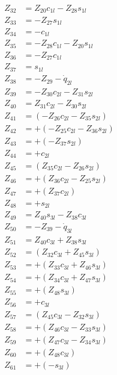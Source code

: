 \begin{multicols}{2}
\begin{align}
Z_{32} &= Z_{20}c_{1l} - Z_{28}s_{1l} \nonumber \\
Z_{33} &= -Z_{27}s_{1l} \nonumber \\ 
Z_{34} &= -c_{1l} \nonumber \\ 
Z_{35} &= -Z_{28}c_{1l} - Z_{20}s_{1l} \nonumber \\ 
Z_{36} &= -Z_{27}c_{1l} \nonumber \\ 
Z_{37} &= s_{1l} \nonumber \\
Z_{38} &=                   - Z_{29} - \dot{q}_{2l} \nonumber \\
Z_{39} &= - Z_{30}c_{2l} - Z_{31}s_{2l} \nonumber \\
Z_{40} &=   Z_{31}c_{2l} - Z_{30}s_{2l} \nonumber \\
Z_{41} &= (- Z_{26}c_{2l} - Z_{35}s_{2l}) \nonumber \\
Z_{42} &= + (- Z_{25}c_{2l} - Z_{36}s_{2l}) \nonumber \\
Z_{43} &= + (-Z_{37}s_{2l}) \nonumber \\ 
Z_{44} &= + c_{2l} \nonumber \\
Z_{45} &= (Z_{35}c_{2l} - Z_{26}s_{2l}) \nonumber \\
Z_{46} &= + (Z_{36}c_{2l} - Z_{25}s_{2l}) \nonumber \\
Z_{47} &= + (Z_{37}c_{2l}) \nonumber \\
Z_{48} &= + s_{2l} \nonumber \\
Z_{49} &= Z_{40}s_{3l} - Z_{38}c_{3l} \nonumber \\
Z_{50} &=                 - Z_{39} - \dot{q}_{3l} \nonumber \\
Z_{51} &= Z_{40}c_{3l} + Z_{38}s_{3l} \nonumber \\
Z_{52} &= (Z_{32}c_{3l} + Z_{45}s_{3l}) \nonumber \\
Z_{53} &= + (Z_{33}c_{3l} + Z_{46}s_{3l}) \nonumber \\
Z_{54} &= + (Z_{34}c_{3l} + Z_{47}s_{3l}) \nonumber \\
Z_{55} &= + (Z_{48}s_{3l}) \nonumber \\ 
Z_{56} &= + c_{3l} \nonumber \\
Z_{57} &= (Z_{45}c_{3l} - Z_{32}s_{3l}) \nonumber \\ 
Z_{58} &= + (Z_{46}c_{3l} - Z_{33}s_{3l}) \nonumber \\
Z_{59} &= + (Z_{47}c_{3l} - Z_{34}s_{3l}) \nonumber \\
Z_{60} &= + (Z_{48}c_{3l}) \nonumber \\ 
Z_{61} &= + (-s_{3l}) \nonumber \\

\end{align}
\end{multicols}
